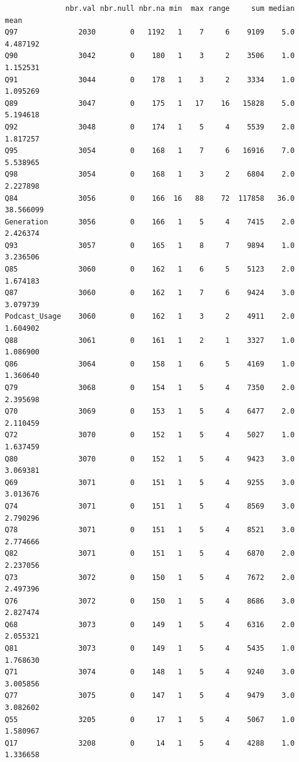 \documentclass[
]{report}
\begin{document}
\begin{verbatim}
              nbr.val nbr.null nbr.na min  max range     sum median        mean
Q97              2030        0   1192   1    7     6    9109    5.0    4.487192
Q90              3042        0    180   1    3     2    3506    1.0    1.152531
Q91              3044        0    178   1    3     2    3334    1.0    1.095269
Q89              3047        0    175   1   17    16   15828    5.0    5.194618
Q92              3048        0    174   1    5     4    5539    2.0    1.817257
Q95              3054        0    168   1    7     6   16916    7.0    5.538965
Q98              3054        0    168   1    3     2    6804    2.0    2.227898
Q84              3056        0    166  16   88    72  117858   36.0   38.566099
Generation       3056        0    166   1    5     4    7415    2.0    2.426374
Q93              3057        0    165   1    8     7    9894    1.0    3.236506
Q85              3060        0    162   1    6     5    5123    2.0    1.674183
Q87              3060        0    162   1    7     6    9424    3.0    3.079739
Podcast_Usage    3060        0    162   1    3     2    4911    2.0    1.604902
Q88              3061        0    161   1    2     1    3327    1.0    1.086900
Q86              3064        0    158   1    6     5    4169    1.0    1.360640
Q79              3068        0    154   1    5     4    7350    2.0    2.395698
Q70              3069        0    153   1    5     4    6477    2.0    2.110459
Q72              3070        0    152   1    5     4    5027    1.0    1.637459
Q80              3070        0    152   1    5     4    9423    3.0    3.069381
Q69              3071        0    151   1    5     4    9255    3.0    3.013676
Q74              3071        0    151   1    5     4    8569    3.0    2.790296
Q78              3071        0    151   1    5     4    8521    3.0    2.774666
Q82              3071        0    151   1    5     4    6870    2.0    2.237056
Q73              3072        0    150   1    5     4    7672    2.0    2.497396
Q76              3072        0    150   1    5     4    8686    3.0    2.827474
Q68              3073        0    149   1    5     4    6316    2.0    2.055321
Q81              3073        0    149   1    5     4    5435    1.0    1.768630
Q71              3074        0    148   1    5     4    9240    3.0    3.005856
Q77              3075        0    147   1    5     4    9479    3.0    3.082602
Q55              3205        0     17   1    5     4    5067    1.0    1.580967
Q17              3208        0     14   1    5     4    4288    1.0    1.336658

\end{verbatim}
\end{document}
